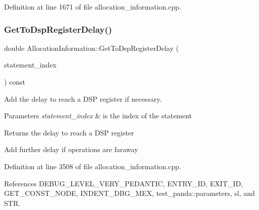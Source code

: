 Definition at line 1671 of file allocation\+\_\+information.\+cpp.

\mbox{\label{classAllocationInformation_ae54845bcbf9ee4155563a5806420b269}} 
\subsubsection{\texorpdfstring{Get\+To\+Dsp\+Register\+Delay()}{GetToDspRegisterDelay()}}
{\footnotesize\ttfamily double Allocation\+Information\+::\+Get\+To\+Dsp\+Register\+Delay (\begin{DoxyParamCaption}\item[{const unsigned int}]{statement\+\_\+index }\end{DoxyParamCaption}) const\hspace{0.3cm}{\ttfamily [private]}}



Add the delay to reach a D\+SP register if necessary. 


\begin{DoxyParams}{Parameters}
{\em statement\+\_\+index} & is the index of the statement \\
\hline
\end{DoxyParams}
\begin{DoxyReturn}{Returns}
the delay to reach a D\+SP register 
\end{DoxyReturn}
Add further delay if operations are faraway 

Definition at line 3508 of file allocation\+\_\+information.\+cpp.



References D\+E\+B\+U\+G\+\_\+\+L\+E\+V\+E\+L\+\_\+\+V\+E\+R\+Y\+\_\+\+P\+E\+D\+A\+N\+T\+IC, E\+N\+T\+R\+Y\+\_\+\+ID, E\+X\+I\+T\+\_\+\+ID, G\+E\+T\+\_\+\+C\+O\+N\+S\+T\+\_\+\+N\+O\+DE, I\+N\+D\+E\+N\+T\+\_\+\+D\+B\+G\+\_\+\+M\+EX, test\+\_\+panda\+::parameters, sl, and S\+TR.

\mbox{\label{classAllocationInformation_a4dbe44ffa8fa9b7b986a1d442f3a3867}} 
